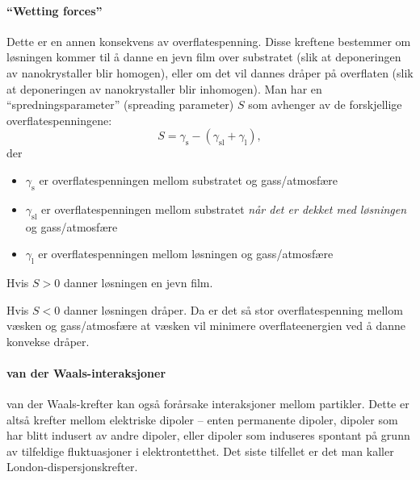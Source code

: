 \paragraph{``Wetting forces''} Dette er en annen konsekvens av overflatespenning. Disse kreftene bestemmer om løsningen kommer til å danne en jevn film over substratet (slik at deponeringen av nanokrystaller blir homogen), eller om det vil dannes dråper på overflaten (slik at deponeringen av nanokrystaller blir inhomogen). Man har en ``spredningsparameter'' (spreading parameter) $S$ som avhenger av de forskjellige overflatespenningene:
\begin{equation}
	S = \gamma_{\text{s}} - (\gamma_{\text{sl}} + \gamma_{\text{l}}),
\end{equation}
der
\begin{itemize}
	\item $\gamma_{\text{s}}$ er overflatespenningen mellom substratet og gass/atmosfære
	\item $\gamma_{\text{sl}}$ er overflatespenningen mellom substratet \emph{når det er dekket med løsningen} og gass/atmosfære
	\item $\gamma_{\text{l}}$ er overflatespenningen mellom løsningen og gass/atmosfære
\end{itemize}
Hvis $S>0$ danner løsningen en jevn film. 

Hvis $S<0$ danner løsningen dråper. Da er det så stor overflatespenning mellom væsken og gass/atmosfære at væsken vil minimere overflateenergien ved å danne konvekse dråper.

\paragraph{van der Waals-interaksjoner} van der Waals-krefter kan også forårsake interaksjoner mellom partikler. Dette er altså krefter mellom elektriske dipoler -- enten permanente dipoler, dipoler som har blitt indusert av andre dipoler, eller dipoler som induseres spontant på grunn av tilfeldige fluktuasjoner i elektrontetthet. Det siste tilfellet er det man kaller London-dispersjonskrefter.


